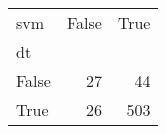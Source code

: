 \begin{tabular}{lrr}
\toprule
svm &  False &  True  \\
dt    &        &        \\
\midrule
False &     27 &     44 \\
True  &     26 &    503 \\
\bottomrule
\end{tabular}

